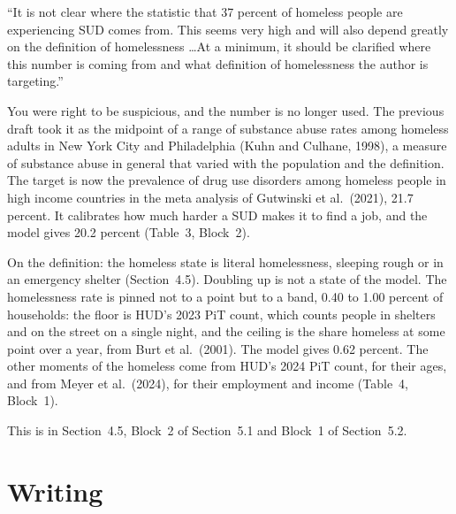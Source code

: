 \documentclass[11pt]{article}
\begin{document}
\begin{referee}
``It is not clear where the statistic that 37 percent of homeless people are
experiencing SUD comes from. This seems very high and will also depend greatly on
the definition of homelessness \dots At a minimum, it should be clarified where
this number is coming from and what definition of homelessness the author is
targeting.''
\end{referee}
\begin{response}
\concede You were right to be suspicious, and the number is no longer used. The
previous draft took it as the midpoint of a range of substance abuse rates among
homeless adults in New York City and Philadelphia (Kuhn and Culhane, 1998), a
measure of substance abuse in general that varied with the population and the
definition. The target is now the prevalence of drug use disorders among homeless
people in high income countries in the meta analysis of Gutwinski et al.\ (2021),
21.7 percent. It calibrates how much harder a SUD makes it to find a job, and the
model gives 20.2 percent (Table~3, Block~2).

On the definition: the homeless state is literal homelessness, sleeping rough or in
an emergency shelter (Section~4.5). Doubling up is not a state of the model. The
homelessness rate is pinned not to a point but to a band, 0.40 to 1.00 percent of
households: the floor is HUD's 2023 PiT count, which counts people in shelters and
on the street on a single night, and the ceiling is the share homeless at some
point over a year, from Burt et al.\ (2001). The model gives 0.62 percent. The other
moments of the homeless come from HUD's 2024 PiT count, for their ages, and from
Meyer et al.\ (2024), for their employment and income (Table~4, Block~1).

This is in Section~4.5, Block~2 of Section~5.1 and Block~1 of Section~5.2.
\end{response}

\section*{Writing}
\end{document}
